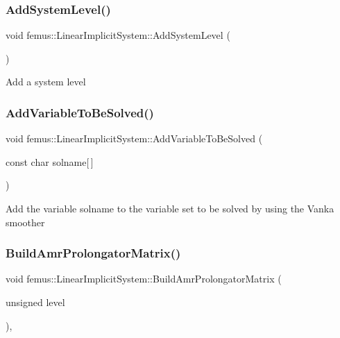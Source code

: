 \subsubsection{\texorpdfstring{Add\+System\+Level()}{AddSystemLevel()}}
{\footnotesize\ttfamily void femus\+::\+Linear\+Implicit\+System\+::\+Add\+System\+Level (\begin{DoxyParamCaption}{ }\end{DoxyParamCaption})}

Add a system level \mbox{\label{classfemus_1_1_linear_implicit_system_ab0c6f96601a00ae5f20a44bd137592b8}} 
\subsubsection{\texorpdfstring{Add\+Variable\+To\+Be\+Solved()}{AddVariableToBeSolved()}}
{\footnotesize\ttfamily void femus\+::\+Linear\+Implicit\+System\+::\+Add\+Variable\+To\+Be\+Solved (\begin{DoxyParamCaption}\item[{const char}]{solname\mbox{[}$\,$\mbox{]} }\end{DoxyParamCaption})}

Add the variable solname to the variable set to be solved by using the Vanka smoother \mbox{\label{classfemus_1_1_linear_implicit_system_af9a972af3c006d71da74f35954b9cecf}} 
\subsubsection{\texorpdfstring{Build\+Amr\+Prolongator\+Matrix()}{BuildAmrProlongatorMatrix()}}
{\footnotesize\ttfamily void femus\+::\+Linear\+Implicit\+System\+::\+Build\+Amr\+Prolongator\+Matrix (\begin{DoxyParamCaption}\item[{unsigned}]{level }\end{DoxyParamCaption})\hspace{0.3cm}{\ttfamily [protected]}, {\ttfamily [virtual]}}



